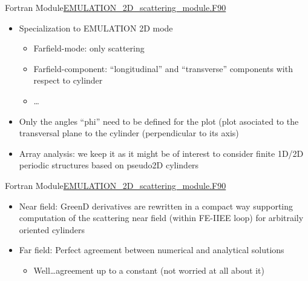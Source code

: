 \begin{frame}{Fortran Module}{\url{EMULATION_2D_scattering_module.F90} }
   \framebreak %
   
   \begin{itemize}
   \item Specialization to EMULATION 2D mode
     \begin{itemize}
     \item Farfield-mode: only scattering %
     \item Farfield-component: ``longitudinal'' and ``transverse''
       components with respect to cylinder
     \item \ldots
     \end{itemize}
     
   \item Only the angles ``phi'' need to be defined for the plot (plot
     asociated to the transversal plane to the cylinder (perpendicular
     to its axis)

   \item Array analysis: we keep it as it might be of interest to
     consider finite 1D/2D periodic structures based on pseudo2D
     cylinders

   \end{itemize}


  \end{frame}

  


  \begin{frame}{Fortran Module}{\url{EMULATION_2D_scattering_module.F90} }

    \begin{itemize}
    \item Near field: {GreenD} derivatives are rewritten in a compact way
      supporting computation of the scattering near field (within
      FE-IIEE loop) for arbitraily oriented cylinders

    \item Far field: Perfect agreement between numerical and analytical
      solutions
      \begin{itemize}
      \item Well\ldots agreement up to a constant (not worried at all about it)
      \end{itemize}
    \end{itemize}

  \end{frame}


  


  
  
